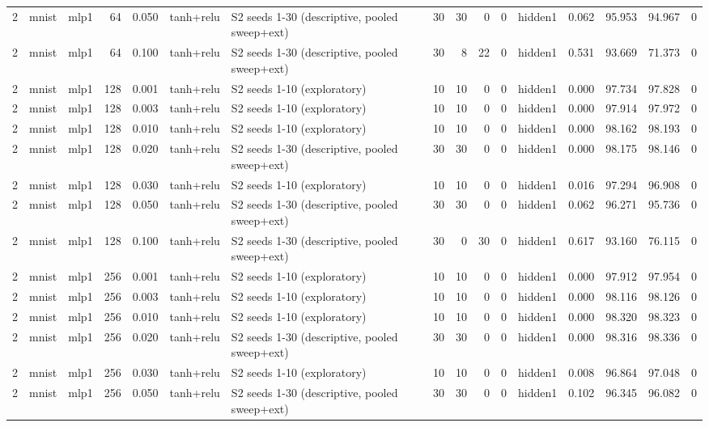 \begin{table}[htbp]
{\begin{tabular}{@{}rllrrllrrrrlrrrr@{}}
2 & mnist & mlp1 & 64 & 0.050 & tanh+relu & S2 seeds 1-30 (descriptive, pooled sweep+ext) & 30 & 30 & 0 & 0 & hidden1 & 0.062 & 95.953 & 94.967 & 0 \\
2 & mnist & mlp1 & 64 & 0.100 & tanh+relu & S2 seeds 1-30 (descriptive, pooled sweep+ext) & 30 & 8 & 22 & 0 & hidden1 & 0.531 & 93.669 & 71.373 & 0 \\
2 & mnist & mlp1 & 128 & 0.001 & tanh+relu & S2 seeds 1-10 (exploratory) & 10 & 10 & 0 & 0 & hidden1 & 0.000 & 97.734 & 97.828 & 0 \\
2 & mnist & mlp1 & 128 & 0.003 & tanh+relu & S2 seeds 1-10 (exploratory) & 10 & 10 & 0 & 0 & hidden1 & 0.000 & 97.914 & 97.972 & 0 \\
2 & mnist & mlp1 & 128 & 0.010 & tanh+relu & S2 seeds 1-10 (exploratory) & 10 & 10 & 0 & 0 & hidden1 & 0.000 & 98.162 & 98.193 & 0 \\
2 & mnist & mlp1 & 128 & 0.020 & tanh+relu & S2 seeds 1-30 (descriptive, pooled sweep+ext) & 30 & 30 & 0 & 0 & hidden1 & 0.000 & 98.175 & 98.146 & 0 \\
2 & mnist & mlp1 & 128 & 0.030 & tanh+relu & S2 seeds 1-10 (exploratory) & 10 & 10 & 0 & 0 & hidden1 & 0.016 & 97.294 & 96.908 & 0 \\
2 & mnist & mlp1 & 128 & 0.050 & tanh+relu & S2 seeds 1-30 (descriptive, pooled sweep+ext) & 30 & 30 & 0 & 0 & hidden1 & 0.062 & 96.271 & 95.736 & 0 \\
2 & mnist & mlp1 & 128 & 0.100 & tanh+relu & S2 seeds 1-30 (descriptive, pooled sweep+ext) & 30 & 0 & 30 & 0 & hidden1 & 0.617 & 93.160 & 76.115 & 0 \\
2 & mnist & mlp1 & 256 & 0.001 & tanh+relu & S2 seeds 1-10 (exploratory) & 10 & 10 & 0 & 0 & hidden1 & 0.000 & 97.912 & 97.954 & 0 \\
2 & mnist & mlp1 & 256 & 0.003 & tanh+relu & S2 seeds 1-10 (exploratory) & 10 & 10 & 0 & 0 & hidden1 & 0.000 & 98.116 & 98.126 & 0 \\
2 & mnist & mlp1 & 256 & 0.010 & tanh+relu & S2 seeds 1-10 (exploratory) & 10 & 10 & 0 & 0 & hidden1 & 0.000 & 98.320 & 98.323 & 0 \\
2 & mnist & mlp1 & 256 & 0.020 & tanh+relu & S2 seeds 1-30 (descriptive, pooled sweep+ext) & 30 & 30 & 0 & 0 & hidden1 & 0.000 & 98.316 & 98.336 & 0 \\
2 & mnist & mlp1 & 256 & 0.030 & tanh+relu & S2 seeds 1-10 (exploratory) & 10 & 10 & 0 & 0 & hidden1 & 0.008 & 96.864 & 97.048 & 0 \\
2 & mnist & mlp1 & 256 & 0.050 & tanh+relu & S2 seeds 1-30 (descriptive, pooled sweep+ext) & 30 & 30 & 0 & 0 & hidden1 & 0.102 & 96.345 & 96.082 & 0 \\

\end{tabular}}
\end{table}
